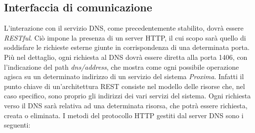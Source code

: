 \documentclass[a4paper,12pt]{report}
\begin{document}
\subsection{Interfaccia di comunicazione} \label{dns-communication}
L'interazione con il servizio DNS, come precedentemente stabilito, dovrà essere \emph{RESTful}. Ciò impone la presenza di un server HTTP, il cui scopo sarà quello di soddisfare le richieste esterne giunte in corrispondenza di una determinata porta. Più nel dettaglio, ogni richiesta al DNS dovrà essere diretta alla porta 1406, con l'indicazione del path \emph{dns/address}, che mostra come ogni possibile operazione agisca su un determinato indirizzo di un servizio del sistema \emph{Proxima}. Infatti il punto chiave di un'architettura REST consiste nel modello delle risorse che, nel caso specifico, sono proprio gli indirizzi dei vari servizi del sistema. Ogni richiesta verso il DNS sarà relativa ad una determinata risorsa, che potrà essere richiesta, creata o eliminata. I metodi del protocollo HTTP gestiti dal server DNS sono i seguenti:
\end{document}

